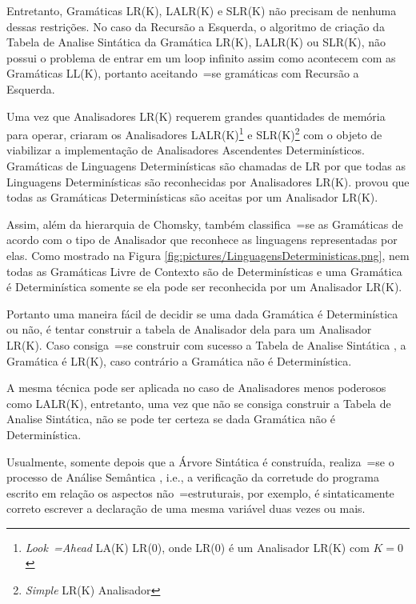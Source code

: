 {    Entretanto,
    Gramáticas LR(K), LALR(K) e
    SLR(K) não precisam de nenhuma dessas restrições.
    No caso da Recursão a Esquerda,
    o algoritmo de criação da Tabela de Analise Sintática da Gramática LR(K),
    LALR(K) ou SLR(K),
    não possui o problema de entrar em um loop infinito assim como acontecem com as Gramáticas LL(K),
    portanto aceitando~=se gramáticas com Recursão a Esquerda.

    Uma vez que Analisadores LR(K) requerem grandes quantidades de memória para operar,
     criaram os Analisadores LALR(K)\footnote{\textit{Look~=Ahead} LA(K) LR(0),
    onde LR(0) é um Analisador LR(K) com $K=0$
    } e
    SLR(K)\footnote{\textit{Simple} LR(K) Analisador} com o objeto de
    viabilizar a implementação de Analisadores Ascendentes Determinísticos.
    Gramáticas de Linguagens Determinísticas são chamadas de LR por que todas
    as Linguagens Determinísticas são reconhecidas por Analisadores LR(K).
     provou que todas as Gramáticas
    Determinísticas são aceitas por um Analisador LR(K).

    Assim,
    além da hierarquia de Chomsky,
    também classifica~=se as Gramáticas de acordo com o tipo de Analisador que reconhece as linguagens representadas por elas.
    Como mostrado na Figura \ref{fig:pictures/LinguagensDeterministicas.png},
    nem todas as Gramáticas Livre de Contexto são de Determinísticas e
    uma Gramática é Determinística somente se ela pode ser reconhecida por um Analisador LR(K).

    Portanto uma maneira fácil de decidir se uma dada Gramática é Determinística ou
    não,
    é tentar construir a tabela de Analisador dela para um Analisador LR(K).
    Caso consiga~=se construir com sucesso a Tabela de Analise Sintática \cite{ahoCompilerDragonBook},
    a Gramática é LR(K),
    caso contrário a Gramática não é Determinística.

    A mesma técnica pode ser aplicada no caso de Analisadores menos poderosos como LALR(K),
    entretanto,
    uma vez que não se consiga construir a Tabela de Analise Sintática,
    não se pode ter certeza se dada Gramática não é Determinística.

    Usualmente,
    somente depois que a Árvore Sintática é construída,
    realiza~=se o processo de Análise Semântica \cite{ahoCompilerDragonBook},
    i.e.,
    a verificação da corretude do programa escrito em relação os aspectos não~=estruturais,
    por exemplo,
    é sintaticamente correto escrever a declaração de uma mesma variável duas vezes ou
    mais.

}

